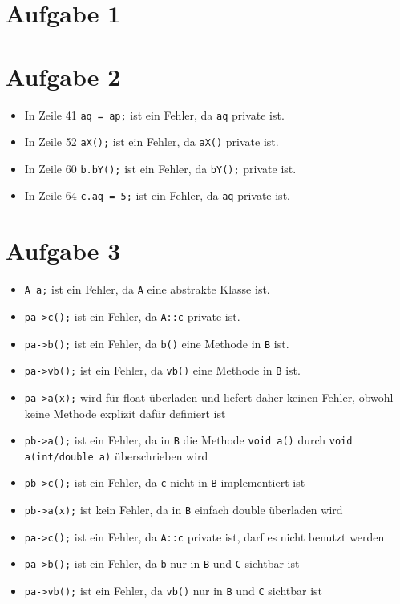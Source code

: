 \documentclass{article}
\begin{document}
    \section*{Aufgabe 1}
    
    \section*{Aufgabe 2}
    \begin{itemize}
        \item In Zeile 41 \lstinline{aq = ap;} ist ein Fehler, da \lstinline{aq} private ist.
        \item In Zeile 52 \lstinline{aX();} ist ein Fehler, da \lstinline{aX()} private ist.
        \item In Zeile 60 \lstinline{b.bY();} ist ein Fehler, da \lstinline{bY();} private ist.
        \item In Zeile 64 \lstinline{c.aq = 5;} ist ein Fehler, da \lstinline{aq} private ist.
    \end{itemize}
    \section*{Aufgabe 3}
    \begin{itemize}
        \item \lstinline{A a;} ist ein Fehler, da \lstinline{A} eine abstrakte Klasse ist.
        \item \lstinline{pa->c();} ist ein Fehler, da \lstinline{A::c} private ist.
        \item \lstinline{pa->b();} ist ein Fehler, da \lstinline{b()} eine Methode in \lstinline{B} ist.
        \item \lstinline{pa->vb();} ist ein Fehler, da \lstinline{vb()} eine Methode in \lstinline{B} ist.
        \item \lstinline{pa->a(x);} wird für float überladen und liefert daher keinen Fehler, obwohl keine Methode explizit dafür definiert ist
        \item \lstinline{pb->a();} ist ein Fehler, da in \lstinline{B} die Methode \lstinline{void a()} durch \lstinline{void a(int/double a)} überschrieben wird
        \item \lstinline{pb->c();} ist ein Fehler, da \lstinline{c} nicht in \lstinline{B} implementiert ist
        \item \lstinline{pb->a(x);} ist kein Fehler, da in \lstinline{B} einfach double überladen wird
        \item \lstinline{pa->c();} ist ein Fehler, da \lstinline{A::c} private ist, darf es nicht benutzt werden
        \item \lstinline{pa->b();} ist ein Fehler, da \lstinline{b} nur in \lstinline{B} und \lstinline{C} sichtbar ist
        \item \lstinline{pa->vb();} ist ein Fehler, da \lstinline{vb()} nur in \lstinline{B} und \lstinline{C} sichtbar ist
    \end{itemize}
\end{document}

